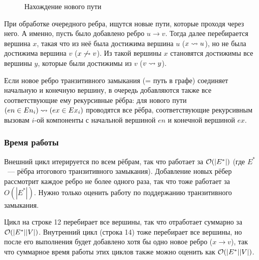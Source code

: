 \begin{figure}\label{img:TC}
  \caption{Нахождение нового пути}
\end{figure}

При обработке очередного ребра, ищутся новые пути, которые проходя через него. А именно, пусть было добавлено ребро $u \to v$. Тогда далее перебирается вершина $x$, такая что из неё была достижима вершина $u$ ($x \rightsquigarrow u$), но не была достижима вершина $v$ ($x \not\rightsquigarrow v$). Из такой вершины $x$ становятся достижимы все вершины $y$, которые были достижимы из $v$ ($v \rightsquigarrow y$).

Если новое ребро транзитивного замыкания (= путь в графе) соединяет начальную и конечную вершину, в очередь добавляются также все соответствующие ему рекурсивные рёбра: для нового пути $(en \in En_i) \rightsquigarrow (ex \in Ex_i)$ проводятся все рёбра, соответствующие рекурсивным вызовам $i$-ой компоненты с начальной вершиной $en$ и конечной вершиной $ex$.

\subsubsection*{Время работы}

Внешний цикл итерируется по всем рёбрам, так что работает за $\mathcal{O}(|E^{*}|)$ (где $E^{*}$~--- рёбра итогового транзитивного замыкания). Добавление новых рёбер рассмотрит каждое ребро не более одного раза, так что тоже работает за $O(|E^{*}|)$. Нужно только оценить работу по поддержанию транзитивного замыкания. 

Цикл на строке 12 перебирает все вершины, так что отработает суммарно за $\mathcal{O}(|E^{*}| |V|)$. Внутренний цикл (строка 14) тоже перебирает все вершины, но после его выполнения будет добавлено хотя бы одно новое ребро ($x \to v$), так что суммарное время работы этих циклов также можно оценить как $\mathcal{O}(|E^{*}| |V|)$.

